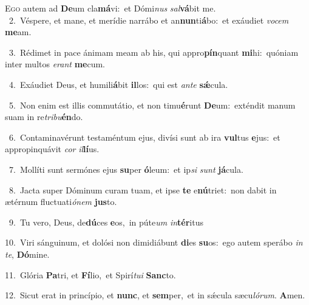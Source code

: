 \lettrine{\initial\textcolor{\initialcolor}{E}}{go} autem ad \textbf{De}\-um cla\-\textbf{má}\-vi:~\star et Dómi\textit{nus} \textit{sal}\-\textbf{vá}bit me.\\
{\numbfont\textcolor{\numbcolor}{~2.}}~Véspere, et mane, et merídie narrábo et an\-\textbf{nun}\-ti\-\textbf{á}\-bo:~\star et exáudiet \textit{vo}\-\textit{cem} \textbf{me}\-am.\par
{\numbfont\textcolor{\numbcolor}{~3.}}~Rédimet in pace ánimam meam ab his, qui appro\-\textbf{pín}\-quant \textbf{mi}\-hi:~\star quóniam inter multos \textit{e}\-\textit{rant} \textbf{me}\-cum.\par
{\numbfont\textcolor{\numbcolor}{~4.}}~Exáudiet Deus, et humili\-\textbf{á}\-bit \textbf{il}\-los:~\star qui est \textit{an}\-\textit{te} \textbf{sǽ}\-cula.\par
{\numbfont\textcolor{\numbcolor}{~5.}}~Non enim est illis commutátio, et non timu\-\textbf{é}\-runt \textbf{De}\-um:~\star exténdit manum suam in re\-\textit{tri}\-\textit{bu}\textbf{én}do.\par
{\numbfont\textcolor{\numbcolor}{~6.}}~Contaminavérunt testaméntum ejus, divísi sunt ab ira \textbf{vul}\-tus \textbf{e}\-jus:~\star et appropinquávit \textit{cor} \textit{il}\-\textbf{lí}us.\par
{\numbfont\textcolor{\numbcolor}{~7.}}~Mollíti sunt sermónes ejus \textbf{su}\-per \textbf{ó}\-leum:~\star et ip\textit{si} \textit{sunt} \textbf{já}\-cula.\par
{\numbfont\textcolor{\numbcolor}{~8.}}~Jacta super Dóminum curam tuam, et ipse \textbf{te} e\-\textbf{nú}\-triet:~\star non dabit in ætérnum fluctuati\-\textit{ó}\-\textit{nem} \textbf{jus}\-to.\par
{\numbfont\textcolor{\numbcolor}{~9.}}~Tu vero, Deus, de\-\textbf{dú}\-ces \textbf{e}\-os,~\star in púte\textit{um} \textit{in}\-\textbf{tér}itus\par
{\numbfont\textcolor{\numbcolor}{10.}}~Viri sánguinum, et dolósi non dimidiábunt \textbf{di}\-es \textbf{su}\-os:~\star ego autem sperábo \textit{in} \textit{te}\-, \textbf{Dó}\-mine.\par
{\numbfont\textcolor{\numbcolor}{11.}}~Glória \textbf{Pa}\-tri, et \textbf{Fí}\-lio,~\star et Spirí\-\textit{tu}\-\textit{i} \textbf{Sanc}\-to.\par
{\numbfont\textcolor{\numbcolor}{12.}}~Sicut erat in princípio, et \textbf{nunc}\-, et \textbf{sem}\-per,~\star et in sǽcula sæcu\-\textit{ló}\-\textit{rum}. \textbf{A}\-men.\par
